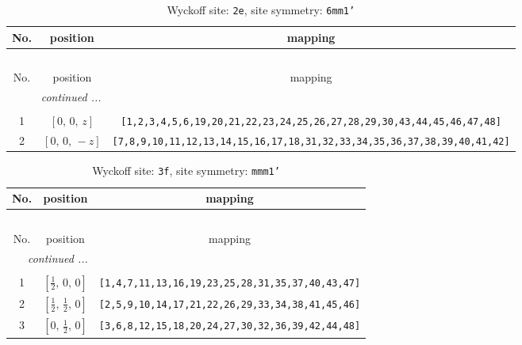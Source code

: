 \documentclass[fleqn,8pt]{jsarticle}
\begin{document}
\begin{longtable}{ccc}
\caption{Wyckoff site: {\tt 2e}, site symmetry: {\tt 6mm1'}}
 \\
 \hline \hline
No. & position & mapping \\ \hline \endfirsthead

\multicolumn{2}{l}{\tablename\ \thetable{}} \\
 \hline \hline
No. & position & mapping \\ \hline \endhead

 \hline \hline
\multicolumn{2}{r}{\footnotesize\it continued ...} \\ \endfoot

 \hline \hline
\multicolumn{2}{r}{} \\ \endlastfoot

1 & $\left[ 0,\, 0,\, z \right]$ & {\tt [1,2,3,4,5,6,19,20,21,22,23,24,25,26,27,28,29,30,43,44,45,46,47,48]} \\ \hline
2 & $\left[ 0,\, 0,\, - z \right]$ & {\tt [7,8,9,10,11,12,13,14,15,16,17,18,31,32,33,34,35,36,37,38,39,40,41,42]} \\
\end{longtable}
\renewcommand{\arraystretch}{1.2}
\begin{longtable}{ccc}
\caption{Wyckoff site: {\tt 3f}, site symmetry: {\tt mmm1'}}
 \\
 \hline \hline
No. & position & mapping \\ \hline \endfirsthead

\multicolumn{2}{l}{\tablename\ \thetable{}} \\
 \hline \hline
No. & position & mapping \\ \hline \endhead

 \hline \hline
\multicolumn{2}{r}{\footnotesize\it continued ...} \\ \endfoot

 \hline \hline
\multicolumn{2}{r}{} \\ \endlastfoot

1 & $\left[ \frac{1}{2},\, 0,\, 0 \right]$ & {\tt [1,4,7,11,13,16,19,23,25,28,31,35,37,40,43,47]} \\ \hline
2 & $\left[ \frac{1}{2},\, \frac{1}{2},\, 0 \right]$ & {\tt [2,5,9,10,14,17,21,22,26,29,33,34,38,41,45,46]} \\ \hline
3 & $\left[ 0,\, \frac{1}{2},\, 0 \right]$ & {\tt [3,6,8,12,15,18,20,24,27,30,32,36,39,42,44,48]} \\
\end{longtable}
\renewcommand{\arraystretch}{1.2}
\end{document}
